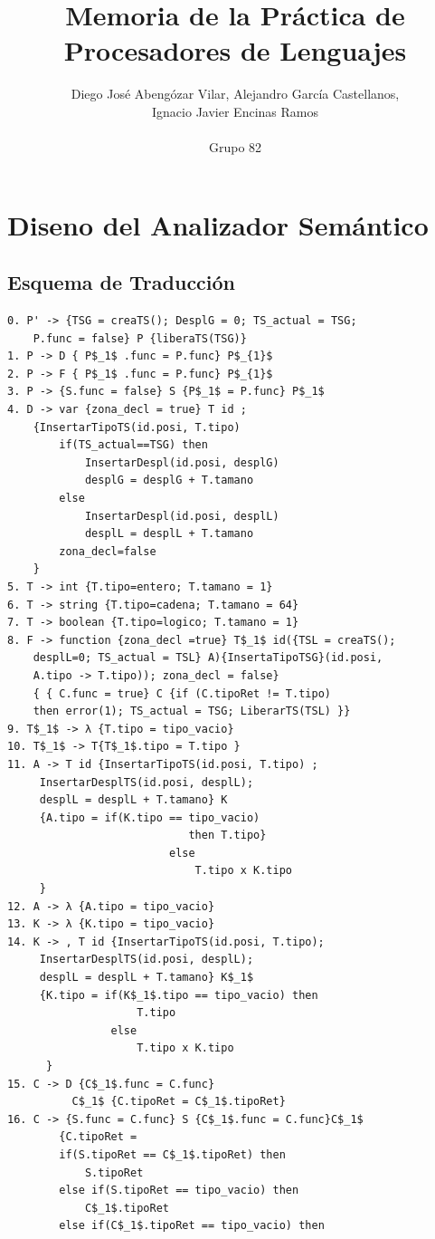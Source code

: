 \documentclass[a4paper, 12pt]{article}
\title{Memoria de la Práctica de Procesadores de Lenguajes}
\author{Diego José Abengózar Vilar, Alejandro García Castellanos,\\ Ignacio Javier Encinas Ramos\\\\Grupo 82}
\begin{document}
\maketitle
\tableofcontents
\newpage
\section{Diseno del Analizador Semántico}
\subsection{Esquema de Traducción}
\begin{lstlisting}[style=EdT]
0. P' -> {TSG = creaTS(); DesplG = 0; TS_actual = TSG;
    P.func = false} P {liberaTS(TSG)}
1. P -> D { P$_1$ .func = P.func} P$_{1}$
2. P -> F { P$_1$ .func = P.func} P$_{1}$
3. P -> {S.func = false} S {P$_1$ = P.func} P$_1$
4. D -> var {zona_decl = true} T id ;
    {InsertarTipoTS(id.posi, T.tipo)
        if(TS_actual==TSG) then
            InsertarDespl(id.posi, desplG)
            desplG = desplG + T.tamano
        else
            InsertarDespl(id.posi, desplL)
            desplL = desplL + T.tamano
        zona_decl=false
    }
5. T -> int {T.tipo=entero; T.tamano = 1}
6. T -> string {T.tipo=cadena; T.tamano = 64}
7. T -> boolean {T.tipo=logico; T.tamano = 1}
8. F -> function {zona_decl =true} T$_1$ id({TSL = creaTS();
    desplL=0; TS_actual = TSL} A){InsertaTipoTSG}(id.posi,
    A.tipo -> T.tipo)); zona_decl = false}
    { { C.func = true} C {if (C.tipoRet != T.tipo)
    then error(1); TS_actual = TSG; LiberarTS(TSL) }}
9. T$_1$ -> λ {T.tipo = tipo_vacio}
10. T$_1$ -> T{T$_1$.tipo = T.tipo }
11. A -> T id {InsertarTipoTS(id.posi, T.tipo) ;
     InsertarDesplTS(id.posi, desplL);
     desplL = desplL + T.tamano} K
     {A.tipo = if(K.tipo == tipo_vacio)
                            then T.tipo}
                         else
                             T.tipo x K.tipo
     }
12. A -> λ {A.tipo = tipo_vacio}
13. K -> λ {K.tipo = tipo_vacio}
14. K -> , T id {InsertarTipoTS(id.posi, T.tipo);
     InsertarDesplTS(id.posi, desplL);
     desplL = desplL + T.tamano} K$_1$
     {K.tipo = if(K$_1$.tipo == tipo_vacio) then
                    T.tipo
                else
                    T.tipo x K.tipo
      }
15. C -> D {C$_1$.func = C.func}
          C$_1$ {C.tipoRet = C$_1$.tipoRet}
16. C -> {S.func = C.func} S {C$_1$.func = C.func}C$_1$
        {C.tipoRet =
        if(S.tipoRet == C$_1$.tipoRet) then
            S.tipoRet
        else if(S.tipoRet == tipo_vacio) then
            C$_1$.tipoRet
        else if(C$_1$.tipoRet == tipo_vacio) then

\end{lstlisting}
\end{document}
